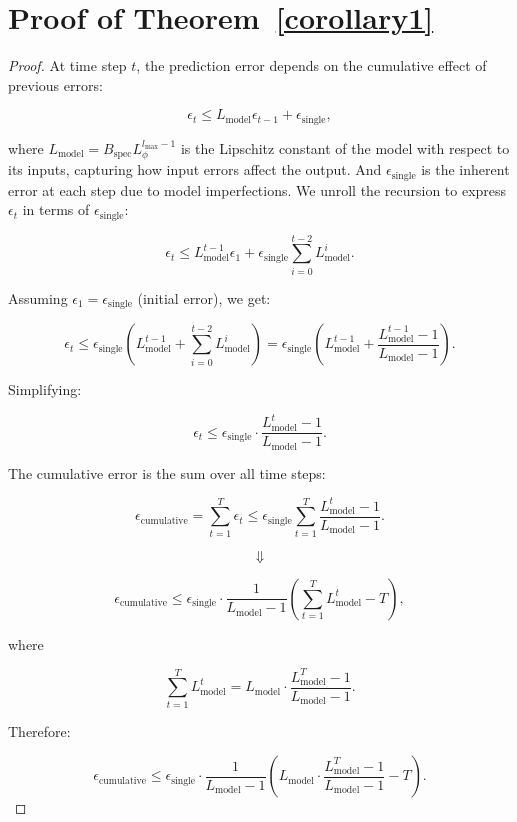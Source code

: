 \section{Proof of Theorem~\ref{corollary1}}\label{appendix:theorem5.7}
\begin{proof}

At time step \( t \), the prediction error depends on the cumulative effect of previous errors:

\[
\epsilon_t \leq L_{\text{model}} \epsilon_{t-1} + \epsilon_{\text{single}},
\]

where
\( L_{\text{model}} = B_{\text{spec}} L_{\phi}^{l_{\text{max}}-1} \) is the Lipschitz constant of the model with respect to its inputs, capturing how input errors affect the output.
And \( \epsilon_{\text{single}} \) is the inherent error at each step due to model imperfections.
We unroll the recursion to express \( \epsilon_t \) in terms of \( \epsilon_{\text{single}} \):

\[
\epsilon_t \leq L_{\text{model}}^{t-1} \epsilon_1 + \epsilon_{\text{single}} \sum_{i=0}^{t-2} L_{\text{model}}^i.
\]

Assuming \( \epsilon_1 = \epsilon_{\text{single}} \) (initial error), we get:

\[
\epsilon_t \leq \epsilon_{\text{single}} \left( L_{\text{model}}^{t-1} + \sum_{i=0}^{t-2} L_{\text{model}}^i \right) = \epsilon_{\text{single}} \left( L_{\text{model}}^{t-1} + \frac{L_{\text{model}}^{t-1} - 1}{L_{\text{model}} - 1} \right).
\]

Simplifying:

\[
\epsilon_t \leq \epsilon_{\text{single}} \cdot \frac{L_{\text{model}}^{t} - 1}{L_{\text{model}} - 1}.
\]

The cumulative error is the sum over all time steps:

\[
\epsilon_{\text{cumulative}} = \sum_{t=1}^{T} \epsilon_t \leq \epsilon_{\text{single}} \sum_{t=1}^{T} \frac{L_{\text{model}}^{t} - 1}{L_{\text{model}} - 1}.
\]


\[\Downarrow\]

\[
\epsilon_{\text{cumulative}} \leq \epsilon_{\text{single}} \cdot \frac{1}{L_{\text{model}} - 1} \left( \sum_{t=1}^{T} L_{\text{model}}^{t} - T \right),
\]

where

\[
\sum_{t=1}^{T} L_{\text{model}}^{t} = L_{\text{model}} \cdot \frac{L_{\text{model}}^{T} - 1}{L_{\text{model}} - 1}.
\]

Therefore:

\[
\epsilon_{\text{cumulative}} \leq \epsilon_{\text{single}} \cdot \frac{1}{L_{\text{model}} - 1} \left( L_{\text{model}} \cdot \frac{L_{\text{model}}^{T} - 1}{L_{\text{model}} - 1} - T \right).
\]




\end{proof}
